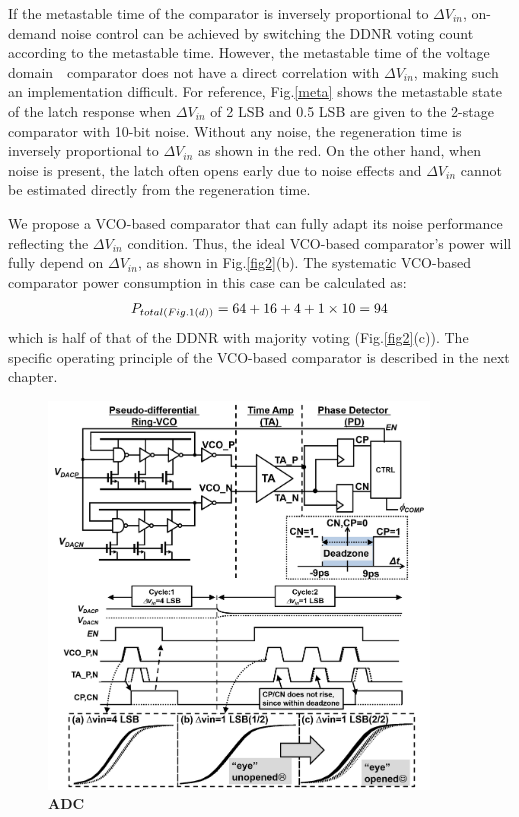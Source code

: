 \documentclass[letterpaper, 10 pt, conference]{ieeeconf}  %
\begin{document}
If the metastable time of the comparator is inversely proportional to $\Delta V_{in}$, on-demand noise control can be achieved by switching the DDNR voting count according to the metastable time.
However, the metastable time of the voltage domain　comparator does not have a direct correlation with $\Delta V_{in}$, making such an implementation difficult. For reference, Fig.\ref{meta} shows the metastable state of the latch response when $\Delta V_{in}$ of 2 LSB and 0.5 LSB are given to the 2-stage comparator \cite{miyahara2008low} with 10-bit noise. Without any noise, the regeneration time is inversely proportional to $\Delta V_{in}$ as shown in the red. On the other hand, when noise is present, the latch often opens early due to noise effects and $\Delta V_{in}$ cannot be estimated directly from the regeneration time.

We propose a VCO-based comparator that can fully adapt its noise performance reflecting the $\Delta V_{in}$ condition. Thus, the ideal VCO-based comparator's power will fully depend on $\Delta V_{in}$, as shown in Fig.\ref{fig2}(b). The systematic VCO-based comparator power consumption in this case can be calculated as:
\begin{eqnarray}
    \centering
    P_{total(Fig.1(d))} = 64+16+4+1\times 10=94
    \label{ddnr}
\end{eqnarray}
which is half of that of the DDNR with majority voting (Fig.\ref{fig2}(c)). 
The specific operating principle of the VCO-based comparator is described in the next chapter.


\begin{figure}[ht!]
\centering
 \includegraphics[width=0.9\textwidth]{figs/full.png}
  \captionsetup{font=footnotesize}
  \caption{\textbf{ADC}}
  \label{schema}
\end{figure}
\end{document}
